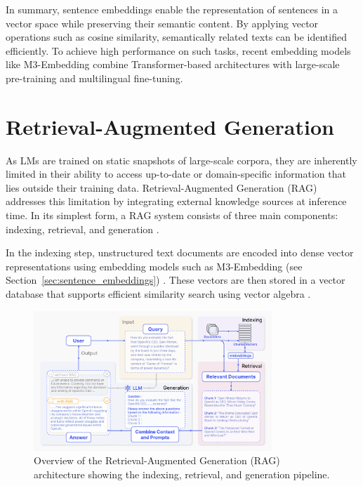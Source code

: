 \documentclass[a4paper,oneside,bibliography=totoc]{scrbook}
\begin{document}
In summary, sentence embeddings enable the representation of sentences in a vector space while preserving their semantic content. By applying vector operations such as cosine similarity, semantically related texts can be identified efficiently. To achieve high performance on such tasks, recent embedding models like M3-Embedding combine Transformer-based architectures with large-scale pre-training and multilingual fine-tuning.


\section{Retrieval-Augmented Generation}
\label{sec:retrieval_augmented_generation}

As \acp{LM} are trained on static snapshots of large-scale corpora, they are inherently limited in their ability to access up-to-date or domain-specific information that lies outside their training data. Retrieval-Augmented Generation (\ac{RAG}) addresses this limitation by integrating external knowledge sources at inference time. In its simplest form, a \ac{RAG} system consists of three main components: indexing, retrieval, and generation \cite{Gao2024}.

In the indexing step, unstructured text documents are encoded into dense vector representations using embedding models such as M3-Embedding (see Section~\ref{sec:sentence_embeddings}) \cite{Gao2024}. These vectors are then stored in a vector database that supports efficient similarity search using vector algebra \cite{Gao2024,Pan2024}.

\begin{figure}[t]
  \centering
  \includegraphics[width=0.8\textwidth]{figures/RAG.png}
  \caption[Overview of the Retrieval-Augmented Generation (RAG) architecture showing the indexing, retrieval, and generation pipeline]{Overview of the Retrieval-Augmented Generation (RAG) architecture showing the indexing, retrieval, and generation pipeline. \cite{Gao2024}}
  \label{fig:rag}
\end{figure}
\end{document}
